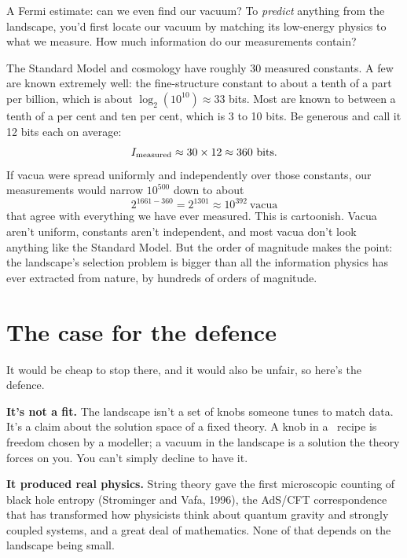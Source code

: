 

\begin{mathbox}{A Fermi estimate: can we even find our vacuum?}
To \emph{predict} anything from the landscape, you'd first locate our vacuum by matching its low-energy physics to what we measure. How much information do our measurements contain?

The Standard Model and cosmology have roughly 30 measured constants. A few are known extremely well: the fine-structure constant to about a tenth of a part per billion, which is about $\log_2(10^{10})\approx33$ bits. Most are known to between a tenth of a per cent and ten per cent, which is 3 to 10 bits. Be generous and call it 12 bits each on average:
\[
I_{\rm measured}\approx30\times12\approx360\ \text{bits}.
\]
If vacua were spread uniformly and independently over those constants, our measurements would narrow $10^{500}$ down to about
\[
2^{1661-360}=2^{1301}\approx10^{392}\ \text{vacua}
\]
that agree with everything we have ever measured. This is cartoonish. Vacua aren't uniform, constants aren't independent, and most vacua don't look anything like the Standard Model. But the order of magnitude makes the point: the landscape's selection problem is bigger than all the information physics has ever extracted from nature, by hundreds of orders of magnitude.
\end{mathbox}

\section{The case for the defence}

It would be cheap to stop there, and it would also be unfair, so here's the defence.

\textbf{It's not a fit.} The landscape isn't a set of knobs someone tunes to match data. It's a claim about the solution space of a fixed theory. A knob in a \LCDM\ recipe is freedom chosen by a modeller; a vacuum in the landscape is a solution the theory forces on you. You can't simply decline to have it.

\textbf{It produced real physics.} String theory gave the first microscopic counting of black hole entropy (Strominger and Vafa, 1996), the AdS/CFT correspondence that has transformed how physicists think about quantum gravity and strongly coupled systems, and a great deal of mathematics. None of that depends on the landscape being small.

